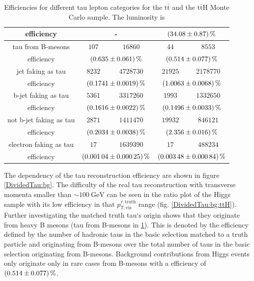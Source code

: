 \begin{table}
\begin{tabular*}{\linewidth}{@{\extracolsep{\fill}}ccccc}
		efficiency                  & \multicolumn{2}{c}{-}   & \multicolumn{2}{c}{$\SI{34.08\pm 0.87}{\percent}$}
		\\
		\hline
		tau from B-mesons           & $107$            & $16860$      & $44$            & $8553$ 
		\\
		efficiency                  & \multicolumn{2}{c}{$\SI{0.635\pm 0.061}{\percent}$}   & \multicolumn{2}{c}{$\SI{0.514\pm 0.077}{\percent}$}
		\\
		\hline
		jet faking as tau            & $8232$         & $4728730$      & $21925$         & $2178770$ 
		\\
		efficiency                  & \multicolumn{2}{c}{$\SI{0.1741\pm 0.0019}{\percent}$}   & \multicolumn{2}{c}{$\SI{1.0063\pm 0.0068}{\percent}$}
		\\
		\hline
		b-jet faking as tau          & $5361$        & $3317260$      & $1993$         & $1332650$ 
		\\
		efficiency                  & \multicolumn{2}{c}{$\SI{0.1616\pm 0.0022}{\percent}$}   & \multicolumn{2}{c}{$\SI{0.1496\pm 0.0033}{\percent}$}
		\\
		\hline
                not b-jet faking as tau          & $2871$        & $1411470$      & $19932$         & $846121$ 
		\\
		efficiency                  & \multicolumn{2}{c}{$\SI{0.2034\pm 0.0038}{\percent}$}   & \multicolumn{2}{c}{$\SI{2.356\pm 0.016}{\percent}$}
		\\
                \hline
                electron faking as tau          & $17$        & $1639390$      & $17$         & $488234$ 
		\\
		efficiency                  & \multicolumn{2}{c}{$\SI{0.00104\pm 0.00025}{\percent}$}   & \multicolumn{2}{c}{$\SI{0.00348\pm 0.00084}{\percent}$}
		\\
		\hline
		\hline
		\end{tabular*}
		\caption[Efficiencies for the t$\bar{\text{t}}$ and the t$\bar{\text{t}}$H sample.]{Efficiencies for different tau lepton categories for the t$\bar{\text{t}}$ and the t$\bar{\text{t}}$H Monte Carlo sample. The luminosity is}
		\label{ttbarttHEffTable}
          \renewcommand{\arraystretch}{1}
\end{table}
%
The dependency of the tau reconstruction efficiency are shown in figure \ref{DividedTau:bg}. The difficulty of the real tau reconstruction with transverse momenta smaller than $\sim\SI{100}{\giga\electronvolt}$ can be seen in the ratio plot of the Higgs sample with its low efficiency in that $p_{T,\text{vis}}^{\tau,\text{truth}}$ range (fig. \ref{DividedTau:bg:ttH}). Further investigating the matched truth tau`s origin shows that they originate from heavy B mesons (tau from B-mesons in \ref{ttbarttHEffTable}). This is denoted by the efficiency defined by the number of hadronic taus in the basic selection matched to a truth particle and originating from B-mesons over the total number of taus in the basic selection originating from B-mesons. Background contributions from Higgs events only originate only in rare cases from B-mesons with a efficiency of $\SI{0.514\pm 0.077}{\percent}$.\par       
